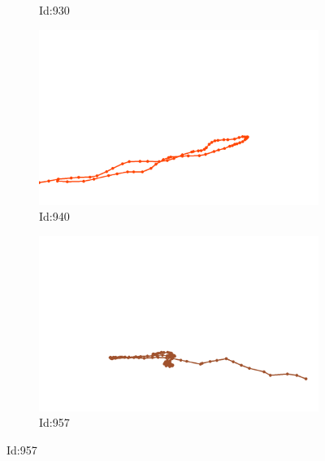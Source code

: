\documentclass[12pt,twoside]{report}
\begin{document}
\begin{figure}
\begin{subfigure}[b]{0.20\textwidth}
\caption{Id:930}
\end{subfigure}
\begin{subfigure}[b]{0.20\textwidth}
\centering
\includegraphics[width=\textwidth]{../trajectories/940.png}
\caption{Id:940}
\end{subfigure}
\begin{subfigure}[b]{0.20\textwidth}
\centering
\includegraphics[width=\textwidth]{../trajectories/957.png}
\caption{Id:957}
\end{subfigure}
\end{figure}
\end{document}
